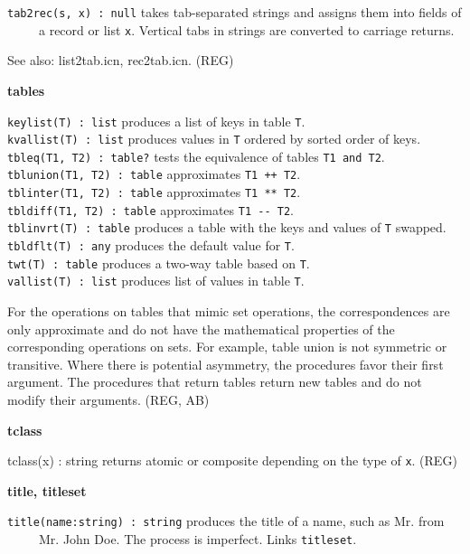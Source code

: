 \texttt{tab2rec(s, x) : null} takes tab-separated strings and assigns
them into fields of\\
 \ \ \ \ \ a record or list \texttt{x}. Vertical tabs in strings are
converted to carriage returns.

See also: list2tab.icn, rec2tab.icn. (REG)

{\sffamily\bfseries
tables}

\texttt{keylist(T) : list} produces a list of keys in table
\texttt{T}.\\
\texttt{kvallist(T) : list} produces values in \texttt{T} ordered by
sorted order of keys.\\
\texttt{tbleq(T1, T2) : table?} tests the equivalence of tables
\texttt{T1 and T2}.\\
\texttt{tblunion(T1, T2) : table} approximates \texttt{T1 ++
T2}.\\
\texttt{tblinter(T1, T2) : table} approximates \texttt{T1 **
T2}.\\
\texttt{tbldiff(T1, T2) : table} approximates \texttt{T1 -{}-
T2}.\\
\texttt{tblinvrt(T) : table} produces a table with the keys and values
of \texttt{T} swapped.\\
\texttt{tbldflt(T) : any} produces the default value for
\texttt{T}.\\
\texttt{twt(T) : table} produces a two-way table
based on \texttt{T}.\\
\texttt{vallist(T) : list} produces list of values in table \texttt{T}.

For the operations on tables that mimic set operations, the
correspondences are only approximate and do not have the mathematical
properties of the corresponding operations on sets. For example, table
{\textquotedbl}union{\textquotedbl} is not symmetric or transitive.
Where there is potential asymmetry, the procedures
{\textquotedbl}favor{\textquotedbl} their first argument. The
procedures that return tables return new tables and do not modify their
arguments. (REG, AB)

{\sffamily\bfseries
tclass}

\textsf{tclass(x) : string} returns {\textquotedbl}atomic{\textquotedbl}
or {\textquotedbl}composite{\textquotedbl} depending on the type of
\texttt{x}. (REG)

{\sffamily\bfseries
title, titleset}

\texttt{title(name:string) : string} produces the title of a name, such
as {\textquotedbl}Mr.{\textquotedbl} from\\
 \ \ \ \ \ {\textquotedbl}Mr. John Doe{\textquotedbl}. The process is
imperfect. Links \texttt{titleset}.

